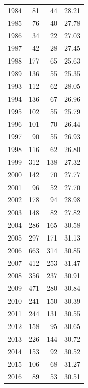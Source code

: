 \documentclass[12pt,]{article}
\begin{document}
\begin{table}[ht]
\begin{tabular}{rrrr}
  1984 &  81 &  44 & 28.21 \\ 
  1985 &  76 &  40 & 27.78 \\ 
  1986 &  34 &  22 & 27.03 \\ 
  1987 &  42 &  28 & 27.45 \\ 
  1988 & 177 &  65 & 25.63 \\ 
  1989 & 136 &  55 & 25.35 \\ 
  1993 & 112 &  62 & 28.05 \\ 
  1994 & 136 &  67 & 26.96 \\ 
  1995 & 102 &  55 & 25.79 \\ 
  1996 & 101 &  70 & 26.44 \\ 
  1997 &  90 &  55 & 26.93 \\ 
  1998 & 116 &  62 & 26.80 \\ 
  1999 & 312 & 138 & 27.32 \\ 
  2000 & 142 &  70 & 27.77 \\ 
  2001 &  96 &  52 & 27.70 \\ 
  2002 & 178 &  94 & 28.98 \\ 
  2003 & 148 &  82 & 27.82 \\ 
  2004 & 286 & 165 & 30.58 \\ 
  2005 & 297 & 171 & 31.13 \\ 
  2006 & 663 & 314 & 30.85 \\ 
  2007 & 412 & 253 & 31.47 \\ 
  2008 & 356 & 237 & 30.91 \\ 
  2009 & 471 & 280 & 30.84 \\ 
  2010 & 241 & 150 & 30.39 \\ 
  2011 & 244 & 131 & 30.55 \\ 
  2012 & 158 &  95 & 30.65 \\ 
  2013 & 226 & 144 & 30.72 \\ 
  2014 & 153 &  92 & 30.52 \\ 
  2015 & 106 &  68 & 31.27 \\ 
  2016 &  89 &  53 & 30.51 \\ 
   \hline
\end{tabular}
\end{table}

\FloatBarrier
\end{document}
